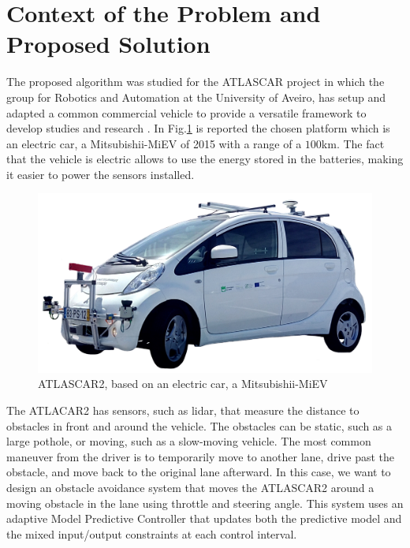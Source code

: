 \documentclass[conference, 11pt]{IEEEtran}
\begin{document}
\section{Context of the Problem and \\  Proposed Solution}
The proposed algorithm was studied for the ATLASCAR project in which the group for Robotics and Automation at the University of Aveiro, has setup and adapted a common commercial vehicle to provide a versatile  framework  to  develop  studies  and  research \cite{atlas} \cite{atlascar1} \cite{atlascar2}.
In Fig.\ref{fig:atlascar2} is reported the chosen platform which is an electric car, a Mitsubishii-MiEV of 2015 with a range of a $100$km.
The fact that the vehicle is electric allows to use the energy stored in the batteries, making it easier to power the sensors installed.
\begin{figure}[H]
	\centering
	\includegraphics[width=0.70\columnwidth]{./figure/atlascar2.jpg}
	\vspace{-12pt}
	\caption{ATLASCAR2, based on an electric car, a Mitsubishii-MiEV}
	\label{fig:atlascar2}
\end{figure}

The ATLACAR2 has sensors, such as lidar, that measure the distance to obstacles in front and around the vehicle. The obstacles can be static, such as a large pothole, or moving, such as a slow-moving vehicle. The most common maneuver from the driver is to temporarily move to another lane, drive past the obstacle, and move back to the original lane afterward. In this case, we want to design an obstacle avoidance system that moves the ATLASCAR2 around a moving obstacle in the lane using throttle and steering angle. This system uses an adaptive Model Predictive Controller that updates both the predictive model and the mixed input/output constraints at each control interval.
\end{document}
